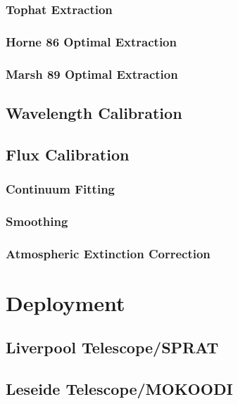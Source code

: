 \documentclass[fleqn,usenatbib]{mnras}
\begin{document}
\subsubsection*{Tophat Extraction}

\subsubsection*{Horne 86 Optimal Extraction}

\subsubsection*{Marsh 89 Optimal Extraction}

\subsection{Wavelength Calibration}

\subsection{Flux Calibration}

\subsubsection*{Continuum Fitting}

\subsubsection*{Smoothing}

\subsubsection*{Atmospheric Extinction Correction}

\section{Deployment}

\subsection{Liverpool Telescope/SPRAT}

\subsection{Leseide Telescope/MOKOODI}
\end{document}
